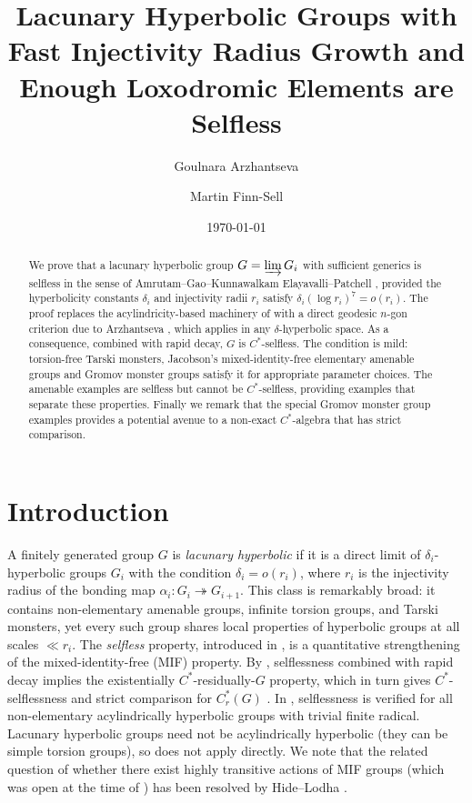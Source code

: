\documentclass[12pt]{amsart}
\title[Selfless Lacunary Hyperbolic Groups]{Lacunary Hyperbolic Groups with Fast Injectivity Radius Growth and Enough Loxodromic Elements are Selfless}
\date{\today}
\author[G. Arzhantseva]{Goulnara Arzhantseva}
\author[M. Finn-Sell]{Martin Finn-Sell}
\theoremstyle{plain}
\theoremstyle{definition}
\newcommand{\Cstar}{C^*}
\begin{document}
\maketitle

\begin{abstract}
We prove that a lacunary hyperbolic group $G = \varinjlim G_i$ with sufficient generics
is selfless in the sense of Amrutam--Gao--Kunnawalkam Elayavalli--Patchell \cite{AGKE},
provided the hyperbolicity constants $\delta_i$ and injectivity radii $r_i$ satisfy
$\delta_i(\log r_i)^{7} = o(r_i)$.
The proof replaces the acylindricity-based machinery of \cite{AGKE} with
a direct geodesic $n$-gon criterion due to Arzhantseva \cite{Arz01}, which applies
in any $\delta$-hyperbolic space.
As a consequence, combined with rapid decay, $G$ is $\Cstar$-selfless.
The condition is mild: torsion-free Tarski monsters, Jacobson's mixed-identity-free
elementary amenable groups and Gromov monster groups satisfy it for appropriate parameter choices.
The amenable examples are selfless but cannot be $\Cstar$-selfless, providing examples that separate these properties.
Finally we remark that the special Gromov monster group examples provides a potential avenue to a non-exact $\Cstar$-algebra that has strict comparison.
\end{abstract}

\section{Introduction}

A finitely generated group $G$ is \emph{lacunary hyperbolic}
\cite{OOS} if it is a direct limit of $\delta_i$-hyperbolic groups $G_i$
with the condition $\delta_i = o(r_i)$, where $r_i$ is the injectivity radius
of the bonding map $\alpha_i\colon G_i \twoheadrightarrow G_{i+1}$.
This class is remarkably broad: it contains non-elementary amenable groups,
infinite torsion groups, and Tarski monsters, yet every such group shares
local properties of hyperbolic groups at all scales $\ll r_i$.
The \emph{selfless} property, introduced in \cite{AGKE}, is a quantitative
strengthening of the mixed-identity-free (MIF) property.
By \cite[Theorem~3.5]{AGKE},
selflessness combined with rapid decay implies the existentially $\Cstar$-residually-$G$
property, which in turn gives $\Cstar$-selflessness and strict comparison for $\Cstar_r(G)$
\cite[Corollary~3.8]{AGKE}. 
In \cite{AGKE}, selflessness is verified for all non-elementary acylindrically
hyperbolic groups with trivial finite radical.
Lacunary hyperbolic groups need not be
acylindrically hyperbolic (they can be simple torsion groups), so \cite{AGKE} does not apply directly.
We note that the related question of whether there exist highly transitive actions of
MIF groups (which was open at the time of \cite{AGKE}) has been resolved by
Hide--Lodha \cite{HideLodha}.
\medskip
\end{document}

